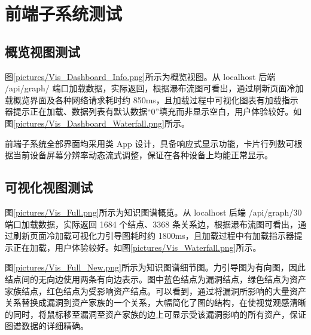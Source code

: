 \documentclass[a4paper,AutoFakeBold,oneside,12pt]{book}
\begin{document}
\section{前端子系统测试}

\subsection{概览视图测试\label{概览视图测试}}

图\ref{pictures/Vis_Dashboard_Info.png}所示为概览视图。从 localhost 后端 /api/graph/ 端口加载数据，实际返回，根据瀑布流图可看出，通过刷新页面冷加载概览界面及各种网络请求耗时约 850ms，且加载过程中可视化图表有加载指示器提示正在加载、数据列表有默认数据``0''填充而非显示空白，用户体验较好。如图\ref{pictures/Vis_Dashboard_Waterfall.png}所示。

前端子系统全部界面均采用类 App 设计，具备响应式显示功能，卡片行列数可根据当前设备屏幕分辨率动态流式调整，保证在各种设备上均能正常显示。



\subsection{可视化视图测试\label{可视化视图测试}}

图\ref{pictures/Vis_Full.png}所示为知识图谱概览。从 localhost 后端 /api/graph/30 端口加载数据，实际返回 1684 个结点、3368 条关系边，根据瀑布流图可看出，通过刷新页面冷加载可视化力引导图耗时约 1800ms，且加载过程中有加载指示器提示正在加载，用户体验较好。如图\ref{pictures/Vis_Waterfall.png}所示。



图\ref{pictures/Vis_Full_New.png}所示为知识图谱细节图。力引导图为有向图，因此结点间的无向边使用两条有向边表示。图中蓝色结点为漏洞结点，绿色结点为资产家族结点，红色结点为受影响资产结点。可以看到，通过将漏洞所影响的大量资产关系替换成漏洞到资产家族的一个关系，大幅简化了图的结构，在使视觉观感清晰的同时，将鼠标移至漏洞至资产家族的边上可显示受该漏洞影响的所有资产，保证图谱数据的详细精确。
\end{document}
